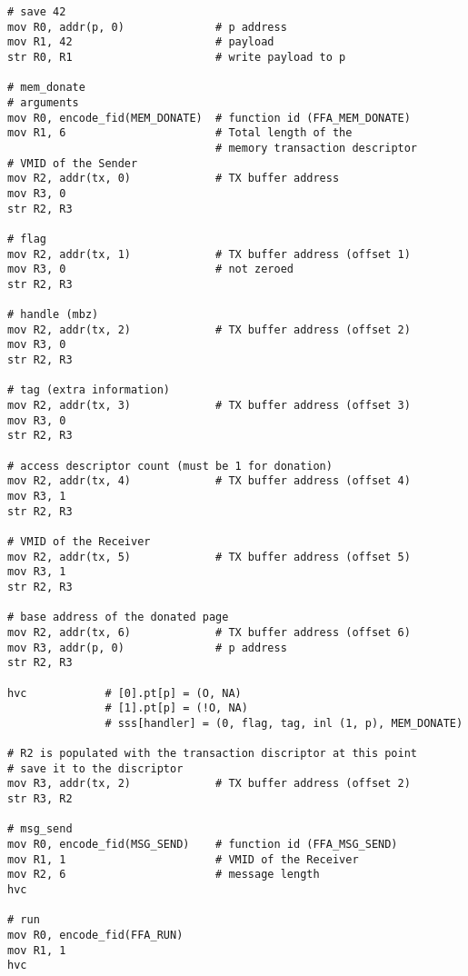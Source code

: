 \documentclass{article}
\begin{document}
\begin{lstlisting}[caption={VM 0}]
# save 42
mov R0, addr(p, 0)              # p address
mov R1, 42                      # payload
str R0, R1                      # write payload to p

# mem_donate
# arguments
mov R0, encode_fid(MEM_DONATE)  # function id (FFA_MEM_DONATE)
mov R1, 6                       # Total length of the  
                                # memory transaction descriptor
# VMID of the Sender 
mov R2, addr(tx, 0)             # TX buffer address                               
mov R3, 0
str R2, R3

# flag
mov R2, addr(tx, 1)             # TX buffer address (offset 1)                               
mov R3, 0                       # not zeroed
str R2, R3

# handle (mbz)
mov R2, addr(tx, 2)             # TX buffer address (offset 2)
mov R3, 0
str R2, R3

# tag (extra information)
mov R2, addr(tx, 3)             # TX buffer address (offset 3)
mov R3, 0
str R2, R3

# access descriptor count (must be 1 for donation)
mov R2, addr(tx, 4)             # TX buffer address (offset 4)
mov R3, 1
str R2, R3

# VMID of the Receiver
mov R2, addr(tx, 5)             # TX buffer address (offset 5)
mov R3, 1
str R2, R3

# base address of the donated page
mov R2, addr(tx, 6)             # TX buffer address (offset 6)
mov R3, addr(p, 0)              # p address
str R2, R3

hvc            # [0].pt[p] = (O, NA)
               # [1].pt[p] = (!O, NA)
               # sss[handler] = (0, flag, tag, inl (1, p), MEM_DONATE)

# R2 is populated with the transaction discriptor at this point
# save it to the discriptor
mov R3, addr(tx, 2)             # TX buffer address (offset 2)
str R3, R2

# msg_send
mov R0, encode_fid(MSG_SEND)    # function id (FFA_MSG_SEND)
mov R1, 1                       # VMID of the Receiver
mov R2, 6                       # message length
hvc

# run
mov R0, encode_fid(FFA_RUN)
mov R1, 1
hvc
\end{lstlisting}
\end{document}
